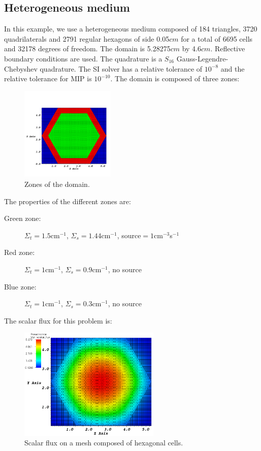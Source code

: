 \subsection{Heterogeneous medium}
In this example, we use a heterogeneous medium composed of 184 triangles, 3720
quadrilaterals and 2791 regular hexagons of side 0.05$cm$ for a total of 6695 
cells and 32178 degrees of freedom. The domain is 5.28275$cm$ by 4.6$cm$. 
Reflective boundary conditions are used. The quadrature is a $S_{16}$ 
Gauss-Legendre-Chebyshev quadrature. The SI solver has a relative tolerance of 
$10^{-8}$ and the relative tolerance for MIP is $10^{-10}$. The domain is 
composed of three zones:
\begin{figure}[H]
\centering
\includegraphics[width=0.4\textwidth]{./Dsa/source_crop}
\caption{Zones of the domain.}
\end{figure}
The properties of the different zones are:
\begin{description}
\item[Green zone:] $\Sigma_t =1.5$cm$^{-1}$, $\Sigma_s = 1.44$cm$^{-1}$, source$ =
1$cm$^{-3}$s$^{-1}$
\item[Red zone:] $\Sigma_t = 1$cm$^{-1}$, $\Sigma_s = 0.9$cm$^{-1}$, no source
\item[Blue zone:] $\Sigma_t = 1$cm$^{-1}$, $\Sigma_s = 0.3$cm$^{-1}$, no source
\end{description}
The scalar flux for this problem is:
\begin{figure}[H]
\centering
\includegraphics[width=0.6\textwidth]{./Dsa/heterog_hex_crop}
\caption{Scalar flux on a mesh composed of hexagonal cells.}
\end{figure}
